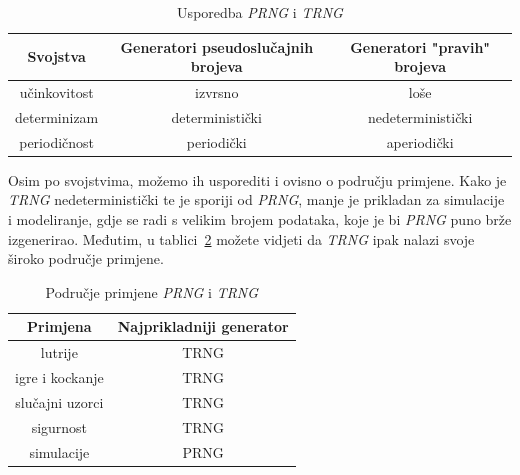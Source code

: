 \documentclass[10pt]{scrartcl}
\newcommand\foreign[1]{\textit{#1}}
\begin{document}
\begin{table}[H]
\centering
\caption{Usporedba \emph{PRNG} i \emph{TRNG}}\label{tab:razlike}
\begin{tabular}{|c|c|c|}
\hline
\textbf{Svojstva} & \textbf{Generatori pseudoslučajnih brojeva} & \textbf{Generatori "pravih" brojeva} \\ \hline
učinkovitost      & izvrsno                                     & loše                                 \\ \hline
determinizam      & deterministički                             & nedeterministički                    \\ \hline
periodičnost      & periodički                                  & aperiodički                          \\ \hline
\end{tabular}
\end{table}
Osim po svojstvima, možemo ih usporediti i ovisno o području primjene. Kako je \foreign{TRNG} nedeterministički te je sporiji od \foreign{PRNG}, manje je prikladan za simulacije i modeliranje, gdje se radi s velikim brojem podataka, koje je bi \foreign{PRNG} puno brže izgenerirao. Međutim, u tablici~\ref{tab:primjena} možete vidjeti da \foreign{TRNG} ipak nalazi svoje široko područje primjene.

\begin{table}[H]
\centering
\caption{Područje primjene \textit{PRNG} i \textit{TRNG}}\label{tab:primjena}
\begin{tabular}{|c|c|}
\hline
\textbf{Primjena} & \textbf{Najprikladniji generator} \\ \hline
lutrije           & TRNG                              \\ \hline
igre i kockanje   & TRNG                              \\ \hline
slučajni uzorci   & TRNG                              \\ \hline
sigurnost         & TRNG                              \\ \hline
simulacije        & PRNG                              \\ \hline
\end{tabular}
\end{table}
\end{document}

